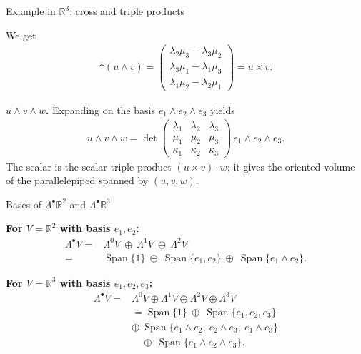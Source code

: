 \begin{frame}{Example in $\mathbb{R}^3$: cross and triple products}
\begin{block}{}
We get
\begin{align*}
\ast(u\wedge v)=
\begin{pmatrix}
\lambda_2\mu_3-\lambda_3\mu_2\\
\lambda_3\mu_1-\lambda_1\mu_3\\
\lambda_1\mu_2-\lambda_2\mu_1
\end{pmatrix}
= u\times v.
\end{align*}

\textbf{$u\wedge v\wedge w$.} Expanding on the basis $e_1\wedge e_2\wedge e_3$ yields
\begin{align*}
u\wedge v\wedge w
= \det\!\begin{pmatrix}
\lambda_1 & \lambda_2 & \lambda_3\\
\mu_1     & \mu_2     & \mu_3\\
\kappa_1  & \kappa_2  & \kappa_3
\end{pmatrix}\, e_1\wedge e_2\wedge e_3.
\end{align*}
The scalar is the scalar triple product $(u\times v)\cdot w$; it gives the oriented volume of the parallelepiped spanned by $(u,v,w)$.
\end{block}

\end{frame}

\begin{frame}{Bases of $\Lambda^\bullet \mathbb{R}^2$ and $\Lambda^\bullet \mathbb{R}^3$}
\begin{block}{}
    \textbf{For $V=\mathbb{R}^2$ with basis $e_1,e_2$:}
\begin{align*}
\Lambda^\bullet V
=& \Lambda^0 V \ \oplus\ \Lambda^1 V \ \oplus\ \Lambda^2 V\\
=& \operatorname{Span}\{1\}\ \oplus\ \operatorname{Span}\{e_1,e_2\}\ \oplus\ \operatorname{Span}\{e_1\wedge e_2\}.
\end{align*}

\textbf{For $V=\mathbb{R}^3$ with basis $e_1,e_2,e_3$:}
\begin{align*}
\Lambda^\bullet V
=& \Lambda^0 V \oplus \Lambda^1 V \oplus \Lambda^2 V \oplus \Lambda^3 V\\
&= \operatorname{Span}\{1\}
\ \oplus\ \operatorname{Span}\{e_1,e_2,e_3\}
\\& \oplus\ \operatorname{Span}\{e_1\wedge e_2,\ e_2\wedge e_3,\ e_1\wedge e_3\}\\
&\quad\oplus\ \operatorname{Span}\{e_1\wedge e_2\wedge e_3\}.
\end{align*}
\end{block}

\end{frame}


